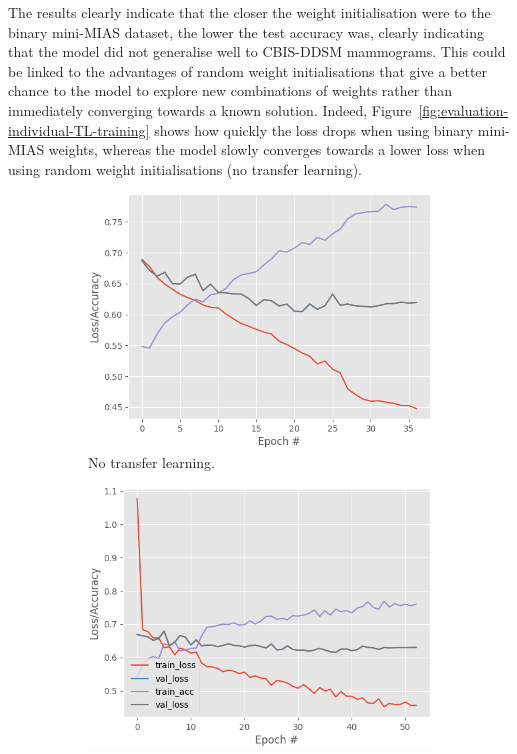 The results clearly indicate that the closer the weight initialisation were to the binary mini-MIAS dataset, the lower the test accuracy was, clearly indicating that the model did not generalise well to CBIS-DDSM mammograms. This could be linked to the advantages of random weight initialisations that give a better chance to the model to explore new combinations of weights rather than immediately converging towards a known solution. Indeed, Figure~\ref{fig:evaluation-individual-TL-training} shows how quickly the loss drops when using binary mini-MIAS weights, whereas the model slowly converges towards a lower loss when using random weight initialisations (no transfer learning).

\begin{figure}[h]
\centering
\begin{subfigure}{.5\textwidth}
  \centering
  \includegraphics[width=\textwidth]{figures/evaluation/individual/TL-none.png}
  \caption{No transfer learning.}
  \label{fig:evaluation-individual-TL-none}
\end{subfigure}%
\begin{subfigure}{.5\textwidth}
  \centering
  \includegraphics[width=\textwidth]{figures/evaluation/individual/TL-all.png}

\end{subfigure}
\end{figure}
